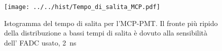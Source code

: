 \begin{figure}[h] \centering \texttt{[image: ../../hist/Tempo\_di\_salita\_MCP.pdf]}\caption{Istogramma del tempo di salita per l'MCP-PMT. Il fronte più ripido della distribuzione a bassi tempi di salita è dovuto alla sensibilità dell' FADC usato, \SI{2}{\nano\second}}\label{hist:Tempo_di_salita_MCP} \end{figure}
